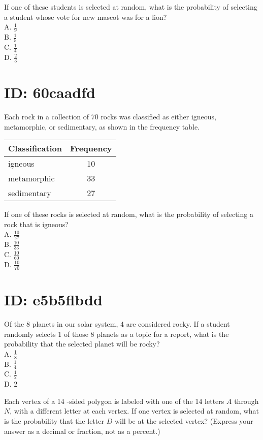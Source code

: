 If one of these students is selected at random, what is the probability of selecting a student whose vote for new mascot was for a lion?\\
A. $\frac{1}{9}$\\
B. $\frac{1}{5}$\\
C. $\frac{1}{4}$\\
D. $\frac{2}{3}$

\section*{ID: 60caadfd}
Each rock in a collection of 70 rocks was classified as either igneous, metamorphic, or sedimentary, as shown in the frequency table.

\begin{center}
\begin{tabular}{|l|c|}
\hline
Classification & Frequency \\
\hline
igneous & 10 \\
\hline
metamorphic & 33 \\
\hline
sedimentary & 27 \\
\hline
\end{tabular}
\end{center}

If one of these rocks is selected at random, what is the probability of selecting a rock that is igneous?\\
A. $\frac{10}{27}$\\
B. $\frac{10}{33}$\\
C. $\frac{10}{60}$\\
D. $\frac{10}{70}$

\section*{ID: e5b5flbdd}
Of the 8 planets in our solar system, 4 are considered rocky. If a student randomly selects 1 of those 8 planets as a topic for a report, what is the probability that the selected planet will be rocky?\\
A. $\frac{1}{8}$\\
B. $\frac{1}{4}$\\
C. $\frac{1}{2}$\\
D. 2

Each vertex of a 14 -sided polygon is labeled with one of the 14 letters $A$ through $N$, with a different letter at each vertex. If one vertex is selected at random, what is the probability that the letter $D$ will be at the selected vertex? (Express your answer as a decimal or fraction, not as a percent.)






















